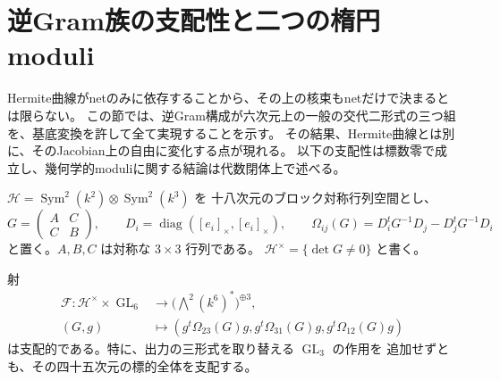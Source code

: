\section{逆Gram族の支配性と二つの楕円moduli}
\label{sec:inverse-gram-dominance-v29}

Hermite曲線がnetのみに依存することから、その上の核束もnetだけで決まるとは限らない。
この節では、逆Gram構成が六次元上の一般の交代二形式の三つ組を、基底変換を許して全て実現することを示す。
その結果、Hermite曲線とは別に、そのJacobian上の自由に変化する点が現れる。
以下の支配性は標数零で成立し、幾何学的moduliに関する結論は代数閉体上で述べる。

$\mathcal H=\operatorname{Sym}^2(k^2)\otimes\operatorname{Sym}^2(k^3)$ を
十八次元のブロック対称行列空間とし、
\[
 G=\begin{pmatrix}A&C\\C&B\end{pmatrix},\qquad
 D_i=\operatorname{diag}([e_i]_\times,[e_i]_\times),\qquad
 \Omega_{ij}(G)=D_i^tG^{-1}D_j-D_j^tG^{-1}D_i
\]
と置く。$A,B,C$ は対称な $3\times3$ 行列である。
$\mathcal H^\times=\{\det G\ne0\}$ と書く。

\begin{theorem}[逆Gram構成の全微分階数]
\label{thm:inverse-gram-full-dominance-v29}
射
\begin{align*}
 \mathcal F:\mathcal H^\times\times\operatorname{GL}_6
 &\longrightarrow\bigl(\textstyle\bigwedge^2(k^6)^*\bigr)^{\oplus3},\\
 (G,g)&\longmapsto
 (g^t\Omega_{23}(G)g,g^t\Omega_{31}(G)g,g^t\Omega_{12}(G)g)
\end{align*}
は支配的である。特に、出力の三形式を取り替える $\operatorname{GL}_3$ の作用を
追加せずとも、その四十五次元の標的全体を支配する。
\end{theorem}

